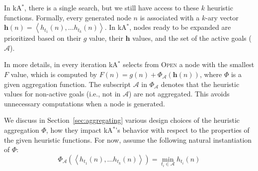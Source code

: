 \documentclass[twoside,11pt]{article}
\newcommand{\astar}{A$^*$\xspace}
\newcommand{\kastar}{kA$^*$\xspace}
\newcommand{\tuple}[1]{\ensuremath{\left \langle #1 \right \rangle }}
\newcommand{\open}{\textsc{Open}\xspace}
\newcommand{\activeg}{\mathcal{A}}
\newcommand{\vect}[1]{\mathbf{#1}}
\begin{document}
In \kastar, there is a single search, but we still have access to these $k$ heuristic functions. Formally, every generated node $n$ is associated with a $k$-ary vector $\vect{h}(n) = \tuple{h_{t_1}(n), \ldots h_{t_k}(n)}$. In \kastar, nodes ready to be expanded are prioritized based on their $g$ value, their $\vect{h}$ values, and the set of the active goals ($\activeg$). 

In more details, in every iteration \kastar selects from \open a node with the smallest $F$ value, which is computed by $F(n) = g(n) + \Phi_{\activeg}(\vect{h}(n))$, 
where $\Phi$ is a given aggregation function. 
The subscript $\activeg$ in $\Phi_\activeg$ denotes that the heuristic values for non-active goals (i.e., not in $\activeg$) are not aggregated.
This avoids  unnecessary computations when a node is generated. %
 
We discuss in Section~\ref{sec:aggregating} various design choices of  the heuristic aggregation $\Phi$, how they impact \kastar's behavior with respect to the properties of the given heuristic functions. %
For now, assume the following natural instantiation of $\Phi$: 
\begin{equation}
\Phi_{\activeg}(\tuple{h_{t_1}(n), \dots h_{t_k}(n)}) = \min_{t_i\in\activeg} h_{t_i}(n) 
\label{eq:basic-phi-min}
\end{equation}




\end{document}
